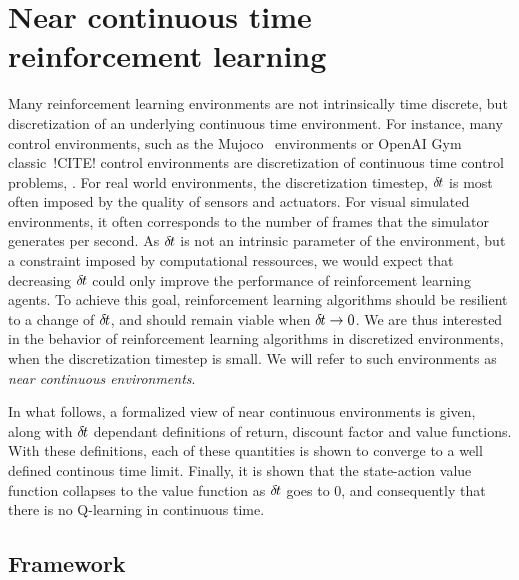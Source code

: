 \section{Near continuous time reinforcement learning}
\label{sec:framework}

  Many reinforcement learning environments are not intrinsically time
	discrete, but discretization of an underlying continuous time
	environment. For instance, many control environments, such as the
	Mujoco~\cite{ddpg} environments or OpenAI Gym classic~!CITE! control
	environments are discretization of continuous time control problems,
        .
	For real world environments, the discretization timestep, ${\delta\hspace{-.1em}t}$ is
	most often imposed by the quality of sensors and actuators. For visual
	simulated environments, it often corresponds to the number of frames
	that the simulator generates per second. As ${\delta\hspace{-.1em}t}$ is not an
	intrinsic parameter of the environment, but a constraint imposed by
	computational ressources, we would expect that decreasing ${\delta\hspace{-.1em}t}$
	could  only improve the performance of reinforcement learning agents.
	To achieve this goal, reinforcement learning algorithms should be
	resilient to a change of ${\delta\hspace{-.1em}t}$, and should remain viable when
	${\delta\hspace{-.1em}t} \rightarrow 0$. We are thus interested in the behavior of
	reinforcement learning algorithms in discretized environments, when the
	discretization timestep is small. We will refer to such environments as
	\emph{near continuous environments}.

	In what follows, a formalized view of near continuous environments is given,
	along with ${\delta\hspace{-.1em}t}$ dependant definitions of return, discount factor and
	value functions. With these definitions, each of these quantities is shown
	to converge to a well defined continous time limit. Finally, it is shown
	that the state-action value function collapses to the value function as
	${\delta\hspace{-.1em}t}$ goes to $0$, and consequently that there is no Q-learning in
	continuous time.
\subsection{Framework}

